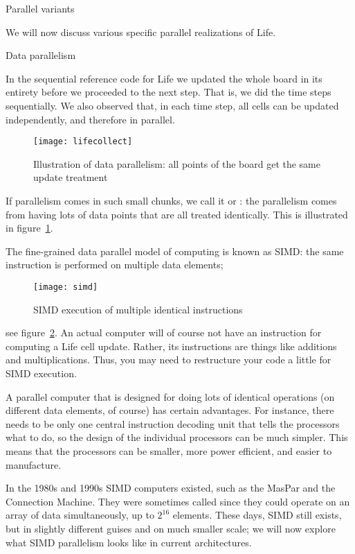  {Parallel variants}

We will now discuss various specific parallel
realizations of Life.

 {Data parallelism}
\label{sec:simd}

In the sequential reference code for Life we
updated the whole board in its entirety before
we proceeded to the next step. That is, we did the time steps
sequentially. 
We also observed that, in each time step, all cells can be updated
independently, and therefore in parallel. 
\begin{figure}[ht]
  \texttt{[image: lifecollect]}
  \caption{Illustration of data parallelism: all points of the board get the same update treatment}
  \label{fig:lifecollect}
\end{figure}
If parallelism comes in
such small chunks, we call it  or
: the
parallelism comes from having lots of data points that are all treated
identically. 
This is illustrated in figure~\ref{fig:lifecollect}.

The fine-grained data parallel model of computing is known as \acf{SIMD}:
the same instruction is performed on multiple data elements;
\begin{figure}[ht]
  \texttt{[image: simd]}
  \caption{SIMD execution of multiple identical instructions}
  \label{fig:simd}
\end{figure}
see figure~\ref{fig:simd}.
An actual computer will of course not have an instruction for computing
a Life cell update. Rather, its instructions are things like additions and multiplications.
Thus, you may need to restructure your code a little for \ac{SIMD}
execution.

A parallel computer that is designed for doing lots of identical 
operations (on different data elements, of course) has certain advantages.
For instance, there needs to be only one central 
instruction decoding unit that tells the processors what to do,
so the design of the individual processors 
can be much simpler. This means that the processors can be smaller,
more power efficient, and easier to manufacture.

In the 1980s and 1990s \ac{SIMD} computers existed, such as the MasPar
and the Connection Machine. They were sometimes called 
since they could operate on an array of data simultaneously,
up to $2^{16}$ elements.
These days, \ac{SIMD} still exists, but in slightly different guises
and on much smaller scale;
we will now explore what \ac{SIMD} parallelism looks like
in current architectures.


